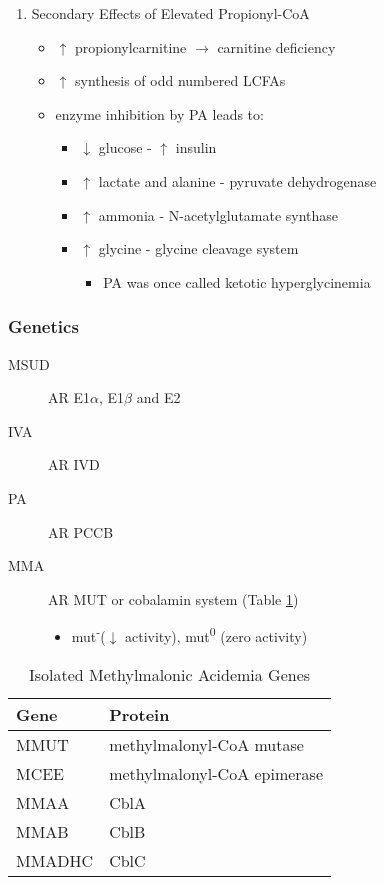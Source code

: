 \documentclass[12pt]{scrartcl}
\begin{document}
\begin{enumerate}
\item Secondary Effects of Elevated Propionyl-CoA
\label{sec:orga5a10b1}
\begin{itemize}
\item \(\uparrow\) propionylcarnitine \(\to\) carnitine deficiency
\item \(\uparrow\) synthesis of odd numbered LCFAs
\item enzyme inhibition by PA leads to:
\begin{itemize}
\item \(\downarrow\) glucose - \(\uparrow\) insulin
\item \(\uparrow\) lactate and alanine - pyruvate dehydrogenase
\item \(\uparrow\) ammonia - N-acetylglutamate synthase
\item \(\uparrow\) glycine - glycine cleavage system
\begin{itemize}
\item PA was once called ketotic hyperglycinemia
\end{itemize}
\end{itemize}
\end{itemize}
\end{enumerate}

\subsubsection{Genetics}
\label{sec:org30c6318}
\begin{description}
\item[{MSUD}] AR E1\(\alpha\), E1\(\beta\) and E2
\item[{IVA}] AR IVD
\item[{PA}] AR PCCB
\item[{MMA}] AR MUT or cobalamin system (Table \ref{tab:org1525cb9})
\begin{itemize}
\item mut\textsuperscript{-}(\(\downarrow\) activity), mut\textsuperscript{0} (zero activity)
\end{itemize}
\end{description}

\begin{table}[htbp]
\caption{\label{tab:org1525cb9}Isolated Methylmalonic Acidemia Genes}
\centering
\begin{tabular}{ll}
Gene & Protein\\
\hline
MMUT & methylmalonyl-CoA mutase\\
MCEE & methylmalonyl-CoA epimerase\\
MMAA & CblA\\
MMAB & CblB\\
MMADHC\footnotemark & CblC\\
\end{tabular}
\end{table}
\end{document}
